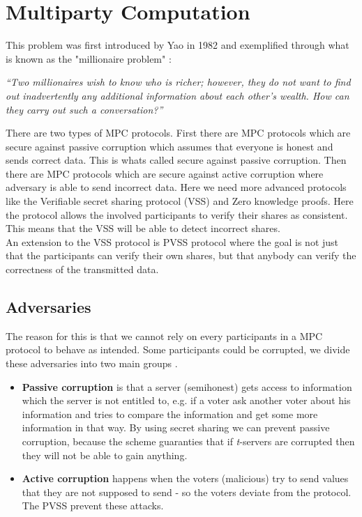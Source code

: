 \section{Multiparty Computation}
This problem was first introduced by Yao in 1982 and exemplified through what is known as the "millionaire problem" \cite{Yao82}:

\begin{center}
\textit{“Two millionaires wish to know who is richer; however, they do not want to find out inadvertently any additional information about each other’s wealth. How can they carry out such a conversation?”}
\end{center}

\noindent
There are two types of MPC protocols. First there are MPC protocols which are secure against passive corruption which assumes that everyone is honest and sends correct data. This is whats called secure against passive corruption. Then there are MPC protocols which are secure against active corruption where adversary is able to send incorrect data. Here we need more advanced protocols like the Verifiable secret sharing protocol (VSS) and Zero knowledge proofs. Here the protocol allows the involved participants to verify their shares as consistent. This means that the VSS will be able to detect incorrect shares. \\



\noindent
An extension to the VSS protocol is PVSS protocol where the goal is not just that the participants can verify their own shares, but that anybody can verify the correctness of the transmitted data. 

\subsection{Adversaries}
The reason for this is that we cannot rely on every participants in a MPC protocol to behave as intended. Some participants could be corrupted, we divide these adversaries into two main groups \cite{IntroCrypto}. 

\begin{itemize}
\item \textbf{Passive corruption} is that a server (semihonest) gets access to information which the server is not entitled to, e.g. if a voter ask another voter about his information and tries to compare the information and get some more information in that way. By using secret sharing we can prevent passive corruption, because the scheme guaranties that if \textit{t}-servers are corrupted then they will not be able to gain anything.

\item \textbf{Active corruption} happens when the voters (malicious) try to send values that they are not supposed to send - so the voters deviate from the protocol. The PVSS prevent these attacks.
\end{itemize}
